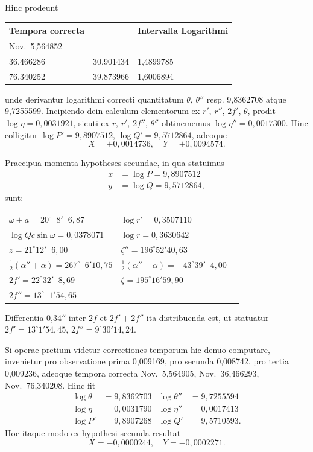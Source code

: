 \documentclass[12pt,a4paper]{article}
\begin{document}
Hinc prodeunt
\begin{center}
\begin{tabular}{lll}
\toprule
Tempora correcta & & Intervalla \quad Logarithmi\\
\midrule
Nov.\ 5,564852 & & \\
36,466286 & 30,901434 & 1,4899785\\
76,340252 & 39,873966 & 1,6006894\\
\bottomrule
\end{tabular}
\end{center}
unde derivantur logarithmi correcti quantitatum $\theta$, $\theta''$ resp. 9,8362708 atque 9,7255599. Incipiendo dein calculum elementorum ex $r'$, $r''$, $2f'$, $\theta$, prodit $\log\eta = 0,0031921$, sicuti ex $r$, $r'$, $2f''$, $\theta''$ obtinememus $\log\eta'' = 0,0017300$. Hinc colligitur $\log P' = 9,8907512$, $\log Q' = 9,5712864$, adeoque
\[X = +0,0014736,\quad Y = +0,0094574.\]

Praecipua momenta hypotheses secundae, in qua statuimus
\begin{align*}
x &= \log P = 9,8907512\\
y &= \log Q = 9,5712864,
\end{align*}
sunt:

\begin{center}
\begin{tabular}{lll}
\toprule
$\omega + a = 20^\circ\;\;8'\;\;6,87$ & $\log r' = 0,3507110$\\
$\log Qc\sin\omega = 0,0378071$ & $\log r = 0,3630642$\\
$z = 21^\circ12'\;\;6,00$ & $\zeta'' = 196^\circ52'40,63$\\
$\tfrac{1}{2}(\alpha'' + \alpha) = 267^\circ\;\;6'10,75$ & $\tfrac{1}{2}(\alpha'' - \alpha) = -43^\circ39'\;\;4,00$\\
$2f' = 22^\circ32'\;\;8,69$ & $\zeta = 195^\circ16'59,90$\\
$2f'' = 13^\circ\;\;1'54,65$ & \\
\bottomrule
\end{tabular}
\end{center}

Differentia 0,34$''$ inter $2f$ et $2f' + 2f''$ ita distribuenda est, ut statuatur $2f' = 13^\circ1'54,45$, $2f'' = 9^\circ30'14,24$.

Si operae pretium videtur correctiones temporum hic denuo computare, invenietur pro observatione prima 0,009169, pro secunda 0,008742, pro tertia 0,009236, adeoque tempora correcta Nov.\ 5,564905, Nov.\ 36,466293, Nov.\ 76,340208. Hinc fit
\begin{align*}
\log\theta &= 9,8362703 & \log\theta'' &= 9,7255594\\
\log\eta &= 0,0031790 & \log\eta'' &= 0,0017413\\
\log P' &= 9,8907268 & \log Q' &= 9,5710593.
\end{align*}
Hoc itaque modo ex hypothesi secunda resultat
\[X = -0,0000244,\quad Y = -0,0002271.\]
\end{document}
